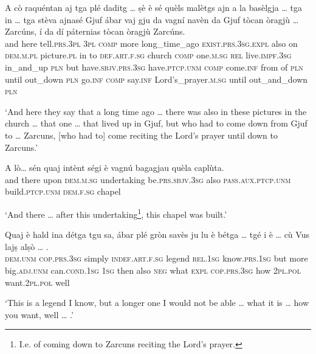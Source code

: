\begin{linenumbers}
\gll A cò raquéntan aj tga plé daditg … ṣè è sé quèls malètgs ajn a la basèlgja … tga in … tga stèva ajnasé Gjuf ábar vaj gju da vagní navèn da Gjuf tòcan òragjù … Zarcúns, í da dí páternias tòcan òragjù Zarcúns.\\
and here tell.\textsc{prs.3pl} \textsc{3pl} \textsc{comp} more long\_time\_ago {} \textsc{exist.prs.3sg.expl} also on \textsc{dem.m.pl} picture.\textsc{pl} in to \textsc{def.art.f.sg} church {} \textsc{comp} one.\textsc{m.sg} {} \textsc{rel} live.\textsc{impf.3sg} in\_and\_up \textsc{pln} but  have.\textsc{sbjv.prs.3sg} have.\textsc{ptcp.unm} \textsc{comp} come.\textsc{inf} from of \textsc{pln} until out\_down {} \textsc{pln} go.\textsc{inf} \textsc{comp} say.\textsc{inf} Lord's\_prayer.\textsc{m.sg} until out\_and\_down \textsc{pln}\\
\end{linenumbers}
\medskip
\glt `And here they say that a long time ago … there was also in these pictures in the church … that one … that lived up in Gjuf, but who had to come down from Gjuf to … Zarcuns, [who had to] come reciting the Lord's prayer until down to Zarcuns.'
\medskip

\begin{linenumbers}
\gll    A lò… sén quaj intènt ségi è vagnú bagagjau quèla caplùta.\\
and there upon \textsc{dem.m.sg} undertaking be.\textsc{prs.sbjv.3sg} also \textsc{pass.aux.ptcp.unm} build.\textsc{ptcp.unm} \textsc{dem.f.sg} chapel \\
\end{linenumbers}
\medskip
\glt `And there … after this undertaking\footnote{I.e. of coming down to Zarcuns reciting the Lord's prayer.}, this chapel was built.'
\medskip

\begin{linenumbers}
\gll    Quaj è hald ina détga tgu sa, ábar plé gròn savès ju lu è bétga … tgé i è … cù Vus lajṣ alṣò … .\\
 \textsc{dem.unm} \textsc{cop.prs.3sg} simply \textsc{indef.art.f.sg} legend \textsc{rel.1sg} know.\textsc{prs.1sg} but more big.\textsc{adj.unm} can.\textsc{cond.1sg} \textsc{1sg} then also \textsc{neg} {} what \textsc{expl}  \textsc{cop.prs.3sg} {} how \textsc{2pl.pol} want.\textsc{2pl.pol} well\\
\end{linenumbers}
\medskip
\glt `This is a legend I know, but a longer one I would not be able … what it is … how you want, well … .'
\bigskip

